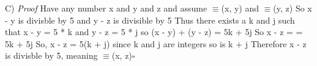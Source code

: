 \documentclass{article}
\begin{document}
C) \textit{Proof}\newline
Have any number x and y and z and assume $\equiv$(x, y) and $\equiv$(y, z)\newline
So x - y is divisble by 5 and y - z is divisible by 5\newline
Thus there exists a k  and j such that x - y = 5 * k and y - z = 5 * j\newline
so (x - y) + (y - z) = 5k + 5j\newline
So x - z = = 5k + 5j\newline
So, x - z = 5(k + j)\newline
since k and j are integers so is k + j\newline
Therefore x - z is divisble by 5, meaning $\equiv$(x, z)$\square$\newline




\enddocument
\end{document}
